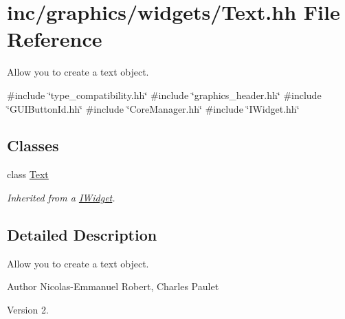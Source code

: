 \hypertarget{Text_8hh}{}\section{inc/graphics/widgets/\+Text.hh File Reference}
\label{Text_8hh}


Allow you to create a text object.  


{\ttfamily \#include \char`\"{}type\+\_\+compatibility.\+hh\char`\"{}}\newline
{\ttfamily \#include \char`\"{}graphics\+\_\+header.\+hh\char`\"{}}\newline
{\ttfamily \#include \char`\"{}G\+U\+I\+Button\+Id.\+hh\char`\"{}}\newline
{\ttfamily \#include \char`\"{}Core\+Manager.\+hh\char`\"{}}\newline
{\ttfamily \#include \char`\"{}I\+Widget.\+hh\char`\"{}}\newline
\subsection*{Classes}
\begin{DoxyCompactItemize}
\item 
class \hyperlink{classText}{Text}
\begin{DoxyCompactList}\small\item\em Inherited from a \hyperlink{classIWidget}{I\+Widget}. \end{DoxyCompactList}\end{DoxyCompactItemize}


\subsection{Detailed Description}
Allow you to create a text object. 

\begin{DoxyAuthor}{Author}
Nicolas-\/\+Emmanuel Robert, Charles Paulet 
\end{DoxyAuthor}
\begin{DoxyVersion}{Version}
2. 
\end{DoxyVersion}
